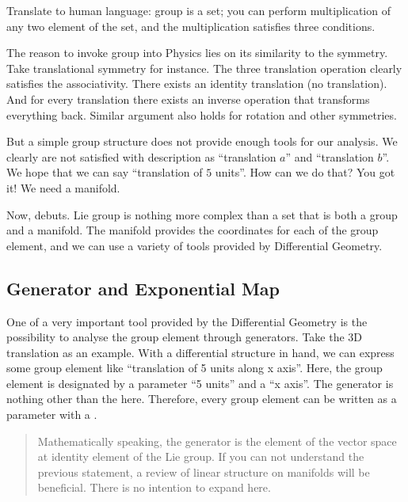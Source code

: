 \documentclass[letterpaper,10pt,english]{sphinxmanual}
\begin{document}
Translate to human language: group is a set; you can perform multiplication of any two element of the set, and the multiplication satisfies three conditions.

The reason to invoke group into Physics lies on its similarity to the symmetry. Take translational symmetry for instance. The three translation operation clearly satisfies the associativity. There exists an identity translation (no translation). And for every translation there exists an inverse operation that transforms everything back. Similar argument also holds for rotation and other symmetries.

But a simple group structure does not provide enough tools for our analysis. We clearly are not satisfied with description as ``translation \(a\)” and ``translation \(b\)”. We hope that we can say ``translation of \(5\) units''. How can we do that? You got it! We need a manifold.

Now,  debuts. Lie group is nothing more complex than a set that is both a group and a manifold. The manifold provides the coordinates for each of the group element, and we can use a variety of tools provided by Differential Geometry.


\subsection{Generator and Exponential Map}
\label{\detokenize{bg_liegp:generator-and-exponential-map}}
One of a very important tool provided by the Differential Geometry is the possibility to analyse the group element through generators. Take the 3D translation as an example. With a differential structure in hand, we can express some group element like ``translation of 5 units along x axis''. Here, the group element is designated by a parameter ``5 units'' and a  ``x axis''. The generator is nothing other than the  here. Therefore, every group element can be written as a parameter with a .
\begin{quote}

Mathematically speaking, the generator is the element of the vector space at identity element of the Lie group. If you can not understand the previous statement, a review of linear structure on manifolds will be beneficial. There is no intention to expand here.
\end{quote}
\end{document}
